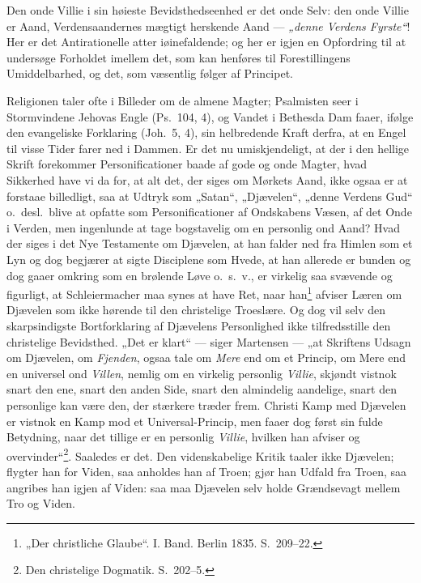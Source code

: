 \documentclass[12pt]{book}
\begin{document}
Den onde Villie i sin høieste Bevidsthedseenhed er det onde Selv:
den onde Villie er Aand, Verdensaandernes mægtigt herskende Aand ---
\emph{„denne Verdens Fyrste“}! Her er det Antirationelle atter
iøinefaldende; og her er igjen en Opfordring til at undersøge
Forholdet imellem det, som kan henføres til Forestillingens
Umiddelbarhed, og det, som væsentlig følger af Principet.

Religionen taler ofte i Billeder om de almene Magter; Psalmisten
seer i Stormvindene Jehovas Engle (Ps.\ 104, 4), og Vandet i
Bethesda Dam faaer, ifølge den evangeliske Forklaring (Joh.\ 5, 4),
sin helbredende Kraft derfra, at en Engel til visse Tider farer ned
i Dammen. Er det
nu umiskjendeligt, at der i den hellige Skrift forekommer
Personificationer baade af gode og onde Magter, hvad Sikkerhed have
vi da for, at alt det, der siges om Mørkets Aand, ikke ogsaa er at
forstaae billedligt, saa at Udtryk som „Satan“, „Djævelen“, „denne
Verdens Gud“ o.\ desl.\ blive at opfatte som Personificationer af
Ondskabens Væsen, af det Onde i Verden, men ingenlunde at tage
bogstavelig om en personlig ond Aand? Hvad der siges i det Nye
Testamente om Djævelen, at han falder ned fra Himlen som et Lyn og
dog begjærer at sigte Disciplene som Hvede, at han allerede er
bunden og dog gaaer omkring som en brølende Løve o.\ s.\ v., er
virkelig saa svævende og figurligt, at Schleiermacher maa synes at
have Ret, naar han\footnote{„Der christliche Glaube“. I. Band.
Berlin 1835. S.\ 209--22.} afviser Læren om Djævelen som ikke
hørende til den christelige Troeslære. Og dog vil selv den
skarpsindigste Bortforklaring af Djævelens Personlighed ikke
tilfredsstille den christelige Bevidsthed. „Det er klart“ --- siger
Martensen --- „at Skriftens Udsagn om Djævelen, om \emph{Fjenden},
ogsaa tale om \emph{Mere} end om et Princip, om Mere end en
universel ond \emph{Villen}, nemlig om en virkelig personlig
\emph{Villie}, skjøndt vistnok snart den ene, snart den anden Side,
snart den almindelig aandelige, snart den personlige kan være den,
der stærkere træder frem. Christi Kamp med Djævelen er vistnok en
Kamp mod et Universal-Princip, men faaer dog først sin fulde
Betydning, naar det tillige er en personlig \emph{Villie}, hvilken
han afviser og overvinder“\footnote{Den christelige Dogmatik.
S.\ 202--5.}. Saaledes er det. Den videnskabelige Kritik taaler
ikke Djævelen; flygter han for Viden, saa anholdes han af Troen;
gjør han Udfald fra Troen, saa angribes han igjen af Viden: saa maa
Djævelen selv holde Grændsevagt mellem Tro og Viden.
\end{document}
